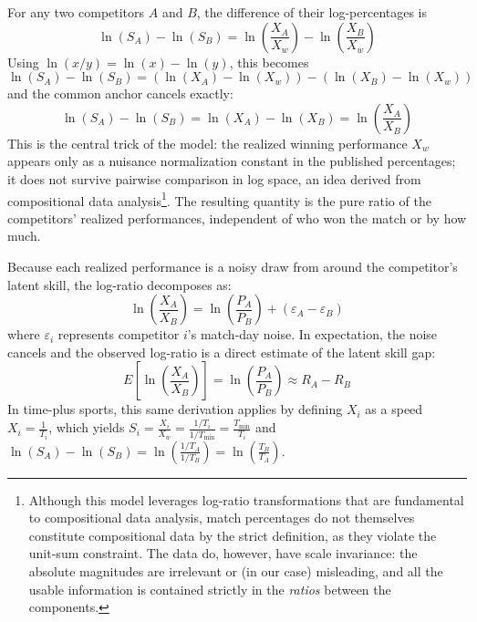 \documentclass[12pt]{article}
\newcommand{\xwin}{X_w}
\newcommand{\tmin}{T_{\mathrm{min}}}
\begin{document}
	For any two competitors $A$ and $B$, the difference of their log-percentages is
	\begin{equation}
		\ln(S_A) - \ln(S_B) = \ln\!\left(\frac{X_A}{\xwin}\right) - \ln\!\left(\frac{X_B}{\xwin}\right)
	\end{equation}
	Using $\ln(x/y) = \ln(x) - \ln(y)$, this becomes
	\begin{equation}
		\ln(S_A) - \ln(S_B) = (\ln(X_A) - \ln(\xwin)) - (\ln(X_B) - \ln(\xwin))
	\end{equation}
	and the common anchor cancels exactly:
	\begin{equation}
		\ln(S_A) - \ln(S_B) = \ln(X_A) - \ln(X_B) = \ln\!\left(\frac{X_A}{X_B}\right)
	\end{equation}
	This is the central trick of the model: the realized winning performance $\xwin$ appears only as a nuisance normalization constant in the published percentages; it does not survive pairwise comparison in log space, an idea derived from compositional data analysis\cite{aitchison1982compositional}\footnote{Although this model leverages log-ratio transformations that are fundamental to compositional data analysis, match percentages do not themselves constitute compositional data by the strict definition, as they violate the unit-sum constraint. The data do, however, have scale invariance: the absolute magnitudes are irrelevant or (in our case) misleading, and all the usable information is contained strictly in the \emph{ratios} between the components.}. The resulting quantity is the pure ratio of the competitors' realized performances, independent of who won the match or by how much.

	Because each realized performance is a noisy draw from around the competitor's latent skill, the log-ratio decomposes as:
	\begin{equation}
		\ln\!\left(\frac{X_A}{X_B}\right) = \ln\!\left(\frac{P_A}{P_B}\right) + (\varepsilon_A - \varepsilon_B)
	\end{equation}
	where $\varepsilon_i$ represents competitor $i$'s match-day noise. In expectation, the noise cancels and the observed log-ratio is a direct estimate of the latent skill gap:
	\begin{equation}
		E\!\left[\ln\!\left(\frac{X_A}{X_B}\right)\right] = \ln\!\left(\frac{P_A}{P_B}\right) \approx R_A - R_B
	\end{equation}
	In time-plus sports, this same derivation applies by defining $X_i$ as a speed $X_i = \frac{1}{T_i}$, which yields $S_i = \frac{X_i}{\xwin} = \frac{1/T_i}{1/\tmin} = \frac{\tmin}{T_i}$ and $\ln(S_A) - \ln(S_B) = \ln\left(\frac{1/T_A}{1/T_B}\right) = \ln\left(\frac{T_B}{T_A}\right)$.
\end{document}
